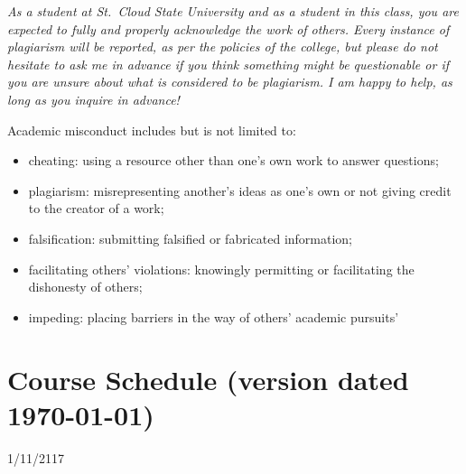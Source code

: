 \documentclass{tufte-handout}
\begin{document}
\begin{fullwidth}
\emph{As a student at St.~Cloud State University and as a student in this class, you are expected to fully and properly acknowledge the work of others. Every instance of plagiarism will be reported, as per the policies of the college, but please do not hesitate to ask me in advance if you think something might be questionable or if you are unsure about what is considered to be plagiarism. I am happy to help, as long as you inquire in advance! }

Academic misconduct includes but is not limited to:

\begin{itemize}
	\item cheating: using a resource other than one's own work to answer questions;
	\item plagiarism: misrepresenting another's ideas as one's own or not giving credit to the creator of a work;
	\item falsification: submitting falsified or fabricated information;
	\item facilitating others' violations: knowingly permitting or facilitating the dishonesty of others;
	\item impeding: placing barriers in the way of others' academic pursuits'
\end{itemize}



\newpage 

\section{Course Schedule (version dated \today)}



  \setlength{\calwidth}{6.5in}
  \setlength{\calboxdepth}{0.7in}
  \begin{calendar}{1/11/21}{17}

  \calday[Monday]{\classday} %
  \calday[Tuesday]{\classday} %
  \skipday\skipday\skipday     
  \skipday\skipday %












\end{calendar}
\end{fullwidth}
\end{document}

